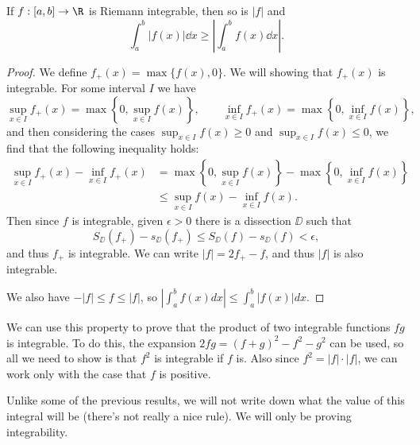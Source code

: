 \begin{proposition}
	If $f :[a, b] \rightarrow \R$ is Riemann integrable, then so is $|f|$ and
	$$
	\int_a^b |f(x) | \dd x \geq \left|\int_a^b f(x) \dd x\right|.
	$$
\end{proposition}
\begin{proof}
	We define $f_+(x) = \max\{f(x), 0\}$. We will showing that $f_+(x)$ is integrable. For some interval $I$ we have
	$$
	\sup_{x \in I} f_+(x) = \max\left\{0, \sup_{x \in I} f(x)\right\}, \quad \quad \inf_{x \in I} f_+(x) = \max\left\{0, \inf_{x \in I} f(x)\right\},
	$$
	and then considering the cases $\sup_{x \in I}f(x) \geq 0$ and $\sup_{x \in I}f(x) \leq 0$, we find that the following inequality holds:
	\begin{align*}
	\sup_{x \in I} f_+(x) - \inf_{x \in I} f_+(x) &= \max\left\{0, \sup_{x \in I} f(x)\right\} - \max\left\{0, \inf_{x \in I} f(x)\right\}  \\
	& \leq \sup_{x \in I} f(x) - \inf_{x \in I} f(x).
\end{align*}
Then since $f$ is integrable, given $\epsilon > 0$ there is a dissection $\DD$ such that
$$
S_{\DD}(f_+) - s_{\DD}(f_+) \leq S_{\DD}(f) - s_{\DD}(f) < \epsilon,
$$
and thus $f_+$ is integrable. We can write $|f| = 2f_+ - f$, and thus $|f|$ is also integrable.

We also have $-|f| \leq f \leq |f|$, so $\left|\int_{a}^{b} f(x) d x\right| \leq \int_{a}^{b}|f(x)| d x$.
\end{proof}

We can use this property to prove that the product of two integrable functions $fg$ is integrable. To do this, the expansion $2fg = (f + g)^2 - f^2 - g^2$ can be used, so all we need to show is that $f^2$ is integrable if $f$ is. Also since $f^2 = |f| \cdot |f|$, we can work only with the case that $f$ is positive.

Unlike some of the previous results, we will not write down what the value of this integral will be (there's not really a nice rule). We will only be proving integrability.

